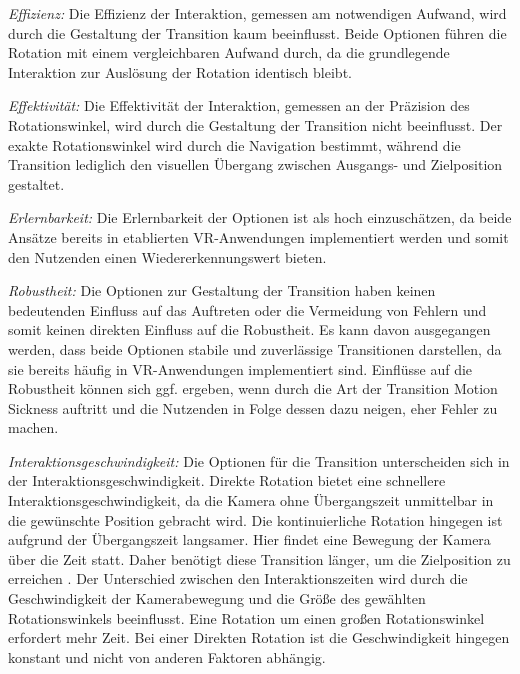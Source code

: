 \textit{Effizienz:}
Die Effizienz der Interaktion, gemessen am notwendigen Aufwand, wird durch die Gestaltung der Transition kaum beeinflusst. Beide Optionen führen die Rotation mit einem vergleichbaren Aufwand durch, da die grundlegende Interaktion zur Auslösung der Rotation identisch bleibt.

\textit{Effektivität:} 
Die Effektivität der Interaktion, gemessen an der Präzision des Rotationswinkel, wird durch die Gestaltung der Transition nicht beeinflusst. Der exakte Rotationswinkel wird durch die Navigation bestimmt, während die Transition lediglich den visuellen Übergang zwischen Ausgangs- und Zielposition gestaltet.

\textit{Erlernbarkeit:}
Die Erlernbarkeit der Optionen ist als hoch einzuschätzen, da beide Ansätze bereits in etablierten VR-Anwendungen implementiert werden und somit den Nutzenden einen Wiedererkennungswert bieten.

\textit{Robustheit:}
Die Optionen zur Gestaltung der Transition haben keinen bedeutenden Einfluss auf das Auftreten oder die Vermeidung von Fehlern und somit keinen direkten Einfluss auf die Robustheit. Es kann davon ausgegangen werden, dass beide Optionen stabile und zuverlässige Transitionen darstellen, da sie bereits häufig in VR-Anwendungen implementiert sind. Einflüsse auf die Robustheit können sich ggf. ergeben, wenn durch die Art der Transition Motion Sickness auftritt und die Nutzenden in Folge dessen dazu neigen, eher Fehler zu machen. 

\textit{Interaktionsgeschwindigkeit:}
Die Optionen für die Transition unterscheiden sich in der Interaktionsgeschwindigkeit. Direkte Rotation bietet eine schnellere Interaktionsgeschwindigkeit, da die Kamera ohne Übergangszeit unmittelbar in die gewünschte Position gebracht wird. Die kontinuierliche Rotation hingegen ist aufgrund der Übergangszeit langsamer. Hier findet eine Bewegung der Kamera über die Zeit statt. Daher benötigt diese Transition länger, um die Zielposition zu erreichen \citep{8797722}. Der Unterschied zwischen den Interaktionszeiten wird durch die Geschwindigkeit der Kamerabewegung und die Größe des gewählten Rotationswinkels beeinflusst. Eine Rotation um einen großen Rotationswinkel erfordert mehr Zeit. Bei einer Direkten Rotation ist die Geschwindigkeit hingegen konstant und nicht von anderen Faktoren abhängig. 

